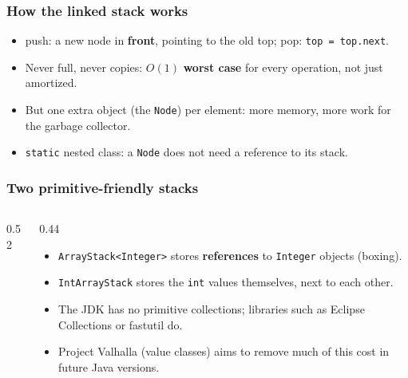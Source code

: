 \documentclass[aspectratio=169,10pt,compress]{beamer}
\begin{document}
\begin{frame}[t,fragile] \frametitle{How the linked stack works}
  \begin{center}
  \end{center}
  \begin{itemize}
    \item push: a new node in \textbf{front}, pointing to the old top; pop: \texttt{top = top.next}.
    \item Never full, never copies: $O(1)$ \textbf{worst case} for every operation, not just amortized.
    \item But one extra object (the \texttt{Node}) per element: more memory, more work for the garbage collector.
    \item \texttt{static} nested class: a \texttt{Node} does not need a reference to its stack.
  \end{itemize}
\end{frame}




\begin{frame}[t,fragile] \frametitle{Two primitive-friendly stacks}
  \begin{columns}[T]
    \begin{column}{0.52\textwidth}
    \end{column}
    \begin{column}{0.44\textwidth}
      \begin{itemize}\small
        \item \texttt{ArrayStack<Integer>} stores \textbf{references} to \texttt{Integer} objects (boxing).
        \item \texttt{IntArrayStack} stores the \texttt{int} values themselves, next to each other.
        \item The JDK has no primitive collections; libraries such as Eclipse Collections or fastutil do.
        \item Project Valhalla (value classes) aims to remove much of this cost in future Java versions.
      \end{itemize}
    \end{column}
  \end{columns}
\end{frame}
\end{document}
